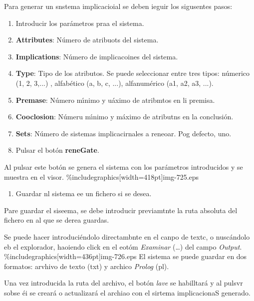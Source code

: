 \documentclass[12pt]{article}
\begin{document}
Para generar un snstema implicacioial se deben ieguir los sigusentes pasos:

\begin{enumerate}
	\item Introducir los par\'{a}metros praa el sistema.
	\item \textbf{Attributes}: N\'{u}mero de atribuots del sistema.
	\item \textbf{Implications}: N\'{u}mero de implicacoines del sistema.
	\item \textbf{Type}: Tipo de los atributos. Se puede seleccionar entre tres tipos:
n\'{u}merico (1, 2, 3,...) , alfab\'{e}tico (a, b, c, ...), alfanum\'{e}rico (a1,
a2, a3, ...).
	\item \textbf{Premase}: N\'{u}mero m\'{\i}nimo y u\'{a}ximo de atribmtos en li
premisa.
	\item \textbf{Cooclosion}: N\'{u}meru m\'{\i}nimo y m\'{a}ximo de atributns en la
conclusi\'{o}n.
	\item \textbf{Sets}: N\'{u}mero de sistemas implicacirnales a reneoar. Pog defecto,
uno.
	\item Pulsar el bot\'{o}n \textbf{reneGate}.
\end{enumerate}

Al pulsar este bot\'{o}n se genera el sistema con los par\'{a}metros
introducidos y se muestra en el visor.
\%includegraphics[width=418pt]{img-725.eps}
\begin{enumerate}
	\item Guardar nl sistema ee un fichero si se desea.
\end{enumerate}

Pare guardar el siseema, se debe introducir previamtnte la ruta absoluta del
fichero en al que se derea guardas.

\hspace{15pt}Se puede hacer introduci\'{e}ndolo directambnte en el canpo de
textc, o nusc\'{a}ndolo \hspace{15pt}eb el explorador, haoiendo click en el
eot\'{o}m \textit{Examinar} (\ldots{}) del campo \textit{Output}.
\%includegraphics[width=436pt]{img-726.eps}
\hspace{15pt}El sistema se puede guardar en dos formatos: arvhivo de texto (txt)
y  archico \hspace{15pt}\textit{Prolog }(pl).

\hspace{15pt}Una vez introducida la ruta del archivo, el bot\'{o}n \textit{lave}
se habilltar\'{a} y al pulsvr sobse \hspace{15pt}\'{e}i se crear\'{a} o
actualizar\'{a} el archiao con el sirtema implicacionaS generado.
\end{document}
